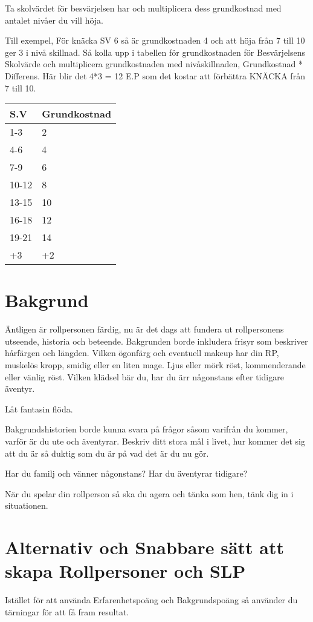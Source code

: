 \documentclass[a4paper, 10pt, titlepage]{article}
\begin{document}
Ta skolvärdet för besvärjelsen har och multiplicera dess grundkostnad med antalet nivåer
du vill höja.

Till exempel, För knäcka SV 6 så är grundkostnaden 4 och att höja från 7 till 10 ger 3 i nivå skillnad.
Så kolla upp i tabellen för grundkostnaden för Besvärjelsens Skolvärde och multiplicera
grundkostnaden med nivåskillnaden, Grundkostnad * Differens. Här blir det 4*3 = 12 E.P som det kostar
att förbättra KNÄCKA från 7 till 10.

\begin{table}[hbp]
  \begin{tabular}{|l|l|}
    \hline
    S.V  &   Grundkostnad \\
    \hline
    1-3   & 2 \\
    \hline
    4-6   & 4 \\
    \hline
    7-9   & 6 \\
    \hline
    10-12 & 8 \\
    \hline
    13-15 & 10 \\
    \hline
    16-18 & 12 \\
    \hline
    19-21 & 14 \\
    \hline
    +3    & +2 \\
    \hline
  \end{tabular}
\end{table}

\section{Bakgrund}
Äntligen är rollpersonen färdig, nu är det dags att fundera ut rollpersonens
utseende, historia och beteende. Bakgrunden borde inkludera frisyr som beskriver
hårfärgen och längden. Vilken ögonfärg och eventuell makeup har din RP, muskelös
kropp, smidig eller en liten mage. Ljus eller mörk röst, kommenderande eller vänlig röst.
Vilken klädsel bär du, har du ärr någonstans efter tidigare äventyr.

Låt fantasin flöda.

Bakgrundshistorien borde kunna svara på frågor såsom varifrån du kommer, varför är du ute
och äventyrar. Beskriv ditt stora mål i livet, hur kommer det sig att du är så duktig som du är
på vad det är du nu gör.

Har du familj och vänner någonstans? Har du äventyrar tidigare?

När du spelar din rollperson så ska du agera och tänka som hen, tänk dig in i situationen.

\section{Alternativ och Snabbare sätt att skapa Rollpersoner och SLP}
Istället för att använda Erfarenhetspoäng och Bakgrundspoäng så använder du tärningar för att
få fram resultat.
\end{document}

